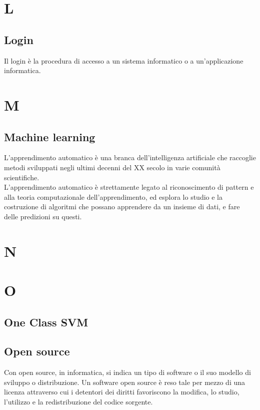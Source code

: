 \section{L}
\subsection{Login}
Il login è la procedura di accesso a un sistema informatico o a un'applicazione informatica.

\section{M}
\subsection{Machine learning}
L'apprendimento automatico è una branca dell'intelligenza artificiale che raccoglie metodi sviluppati negli ultimi decenni del XX secolo in varie comunità scientifiche.\\
L'apprendimento automatico è strettamente legato al riconoscimento di pattern e alla teoria computazionale dell'apprendimento, ed esplora lo studio e la costruzione di algoritmi che possano apprendere da un insieme di dati, e fare delle predizioni su questi.

\section{N}

\section{O}
\subsection{One Class SVM}

\subsection{Open source}
Con open source, in informatica, si indica un tipo di software o il suo modello di sviluppo o distribuzione. Un software open source è reso tale per mezzo di una licenza attraverso cui i detentori dei diritti favoriscono la modifica, lo studio, l'utilizzo e la redistribuzione del codice sorgente.

